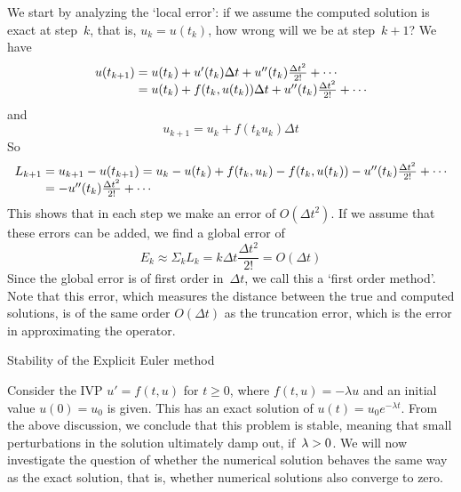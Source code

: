 We start by analyzing the `local error': if we assume the computed
solution is exact at step~$k$, that is, $u_k=u(t_k)$, how wrong will
we be at step~$k+1$? We have
\begin{equation}
  \begin{array}{r@{{}={}}l}
    u(t_{k+1})&u(t_k)+u'(t_k)\Delta t+u''(t_k)\frac{\Delta t^2}{2!}+\cdots\\
    &u(t_k)+f(t_k,u(t_k))\Delta t+u''(t_k)\frac{\Delta
      t^2}{2!}+\cdots\\
  \end{array}
\end{equation}
and
\begin{equation}
    u_{k+1}=u_k+f(t_ku_k)\Delta t    
\end{equation}
  So 
  \begin{equation}
  \begin{array}{r@{{}={}}l}
  L_{k+1}&u_{k+1}-u(t_{k+1})=u_k-u(t_k)+f(t_k,u_k)-f(t_k,u(t_k))
  -u''(t_k)\frac{\Delta t^2}{2!}+\cdots\\
  &-u''(t_k)\frac{\Delta t^2}{2!}+\cdots
  \end{array}
  \end{equation}
This shows that in each step we make an error of $O(\Delta t^2)$. If
we assume that these errors can be added, we find a global error of
\begin{equation}
  E_k\approx\Sigma_k L_k=k\Delta t\frac{\Delta t^2}{2!}  =O(\Delta t)
\end{equation}
%
Since the global error is of first order in~$\Delta t$, we call
this a `first order method'. Note that this error, which measures the
distance between the true and computed solutions, is of the same order
$O(\Delta t)$
as the truncation error, which is the error in approximating the
operator.

 {Stability of the  Explicit Euler method}
\label{sec:stability-e-expl}

Consider the \ac{IVP} $u'=f(t,u)$ for $t\geq0$, 
where $f(t,u)=-\lambda u$ and an initial value $u(0)=u_0$ is given.
This has an exact solution
of $u(t)=u_0e^{-\lambda t}$. From the above discussion, we conclude
that this problem is stable, meaning that small perturbations in the
solution ultimately damp out, if~$\lambda>\nobreak0$. We will now
investigate the question of whether the numerical solution behaves the
same way as the exact solution, that is, 
whether numerical solutions also converge
to zero.

